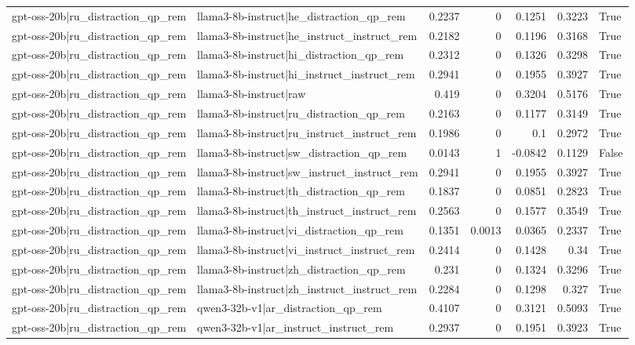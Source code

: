 \begin{table}
\begin{tabular}{l l r r r r l}
gpt-oss-20b|ru_distraction_qp_rem & llama3-8b-instruct|he_distraction_qp_rem & 0.2237 & 0 & 0.1251 & 0.3223 & True \\
gpt-oss-20b|ru_distraction_qp_rem & llama3-8b-instruct|he_instruct_instruct_rem & 0.2182 & 0 & 0.1196 & 0.3168 & True \\
gpt-oss-20b|ru_distraction_qp_rem & llama3-8b-instruct|hi_distraction_qp_rem & 0.2312 & 0 & 0.1326 & 0.3298 & True \\
gpt-oss-20b|ru_distraction_qp_rem & llama3-8b-instruct|hi_instruct_instruct_rem & 0.2941 & 0 & 0.1955 & 0.3927 & True \\
gpt-oss-20b|ru_distraction_qp_rem & llama3-8b-instruct|raw & 0.419 & 0 & 0.3204 & 0.5176 & True \\
gpt-oss-20b|ru_distraction_qp_rem & llama3-8b-instruct|ru_distraction_qp_rem & 0.2163 & 0 & 0.1177 & 0.3149 & True \\
gpt-oss-20b|ru_distraction_qp_rem & llama3-8b-instruct|ru_instruct_instruct_rem & 0.1986 & 0 & 0.1 & 0.2972 & True \\
gpt-oss-20b|ru_distraction_qp_rem & llama3-8b-instruct|sw_distraction_qp_rem & 0.0143 & 1 & -0.0842 & 0.1129 & False \\
gpt-oss-20b|ru_distraction_qp_rem & llama3-8b-instruct|sw_instruct_instruct_rem & 0.2941 & 0 & 0.1955 & 0.3927 & True \\
gpt-oss-20b|ru_distraction_qp_rem & llama3-8b-instruct|th_distraction_qp_rem & 0.1837 & 0 & 0.0851 & 0.2823 & True \\
gpt-oss-20b|ru_distraction_qp_rem & llama3-8b-instruct|th_instruct_instruct_rem & 0.2563 & 0 & 0.1577 & 0.3549 & True \\
gpt-oss-20b|ru_distraction_qp_rem & llama3-8b-instruct|vi_distraction_qp_rem & 0.1351 & 0.0013 & 0.0365 & 0.2337 & True \\
gpt-oss-20b|ru_distraction_qp_rem & llama3-8b-instruct|vi_instruct_instruct_rem & 0.2414 & 0 & 0.1428 & 0.34 & True \\
gpt-oss-20b|ru_distraction_qp_rem & llama3-8b-instruct|zh_distraction_qp_rem & 0.231 & 0 & 0.1324 & 0.3296 & True \\
gpt-oss-20b|ru_distraction_qp_rem & llama3-8b-instruct|zh_instruct_instruct_rem & 0.2284 & 0 & 0.1298 & 0.327 & True \\
gpt-oss-20b|ru_distraction_qp_rem & qwen3-32b-v1|ar_distraction_qp_rem & 0.4107 & 0 & 0.3121 & 0.5093 & True \\
gpt-oss-20b|ru_distraction_qp_rem & qwen3-32b-v1|ar_instruct_instruct_rem & 0.2937 & 0 & 0.1951 & 0.3923 & True \\

\end{tabular}
\end{table}
